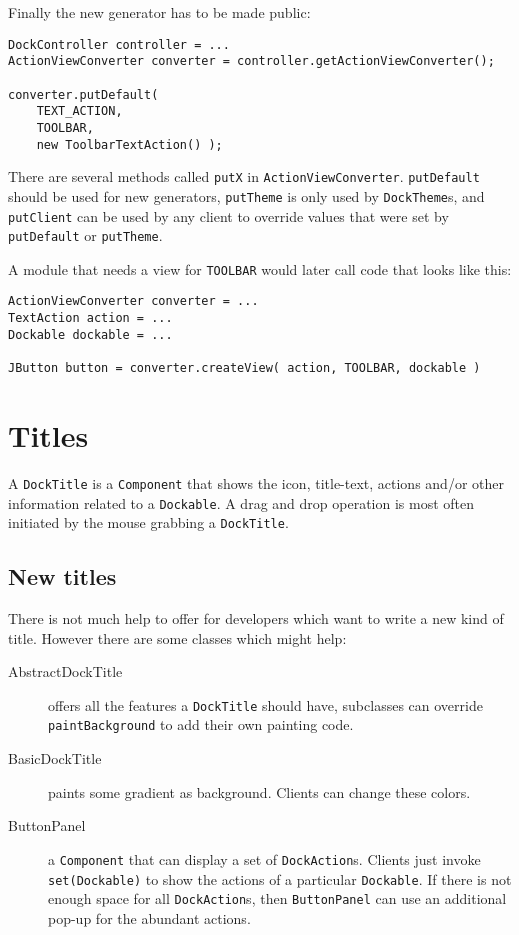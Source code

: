 \documentclass[a4paper,10pt]{article}
\newcommand{\src}[1]{\lstinline[basicstyle=\normalsize\ttfamily,keywordstyle=\normalsize\ttfamily,identifierstyle=\normalsize\ttfamily]|#1|}
\begin{document}
Finally the new generator has to be made public:
\begin{lstlisting}
DockController controller = ...
ActionViewConverter converter = controller.getActionViewConverter();

converter.putDefault( 
	TEXT_ACTION,
	TOOLBAR,
	new ToolbarTextAction() );
\end{lstlisting}
There are several methods called \src{putX} in \src{ActionViewConverter}. \src{putDefault} should be used for new generators, \src{putTheme} is only used by \src{DockTheme}s, and \src{putClient} can be used by any client to override values that were set by \src{putDefault} or \src{putTheme}.

A module that needs a view for \src{TOOLBAR} would later call code that looks like this:
\begin{lstlisting}
ActionViewConverter converter = ...
TextAction action = ...
Dockable dockable = ...

JButton button = converter.createView( action, TOOLBAR, dockable )
\end{lstlisting}

\section{Titles}
A \src{DockTitle} is a \src{Component} that shows the icon, title-text, actions and/or other information related to a \src{Dockable}. A drag and drop operation is most often initiated by the mouse grabbing a \src{DockTitle}.

\subsection{New titles}
There is not much help to offer for developers which want to write a new kind of title. However there are some classes which might help:
\begin{description}
 \item[AbstractDockTitle] offers all the features a \src{DockTitle} should have, subclasses can override \src{paintBackground} to add their own painting code.
 \item[BasicDockTitle] paints some gradient as background. Clients can change these colors.
 \item[ButtonPanel] a \src{Component} that can display a set of \src{DockAction}s. Clients just invoke \src{set(Dockable)} to show the actions of a particular \src{Dockable}. If there is not enough space for all \src{DockAction}s, then \src{ButtonPanel} can use an additional pop-up for the abundant actions.
\end{description}
\end{document}
